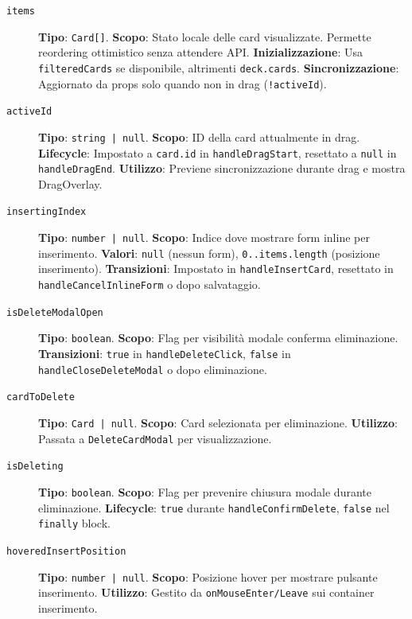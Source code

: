 \documentclass[11pt,a4paper]{article}
\begin{document}
\begin{description}
    \item[\texttt{items}] \textbf{Tipo}: \texttt{Card[]}. \textbf{Scopo}: Stato locale delle card visualizzate. Permette reordering ottimistico senza attendere API. \textbf{Inizializzazione}: Usa \texttt{filteredCards} se disponibile, altrimenti \texttt{deck.cards}. \textbf{Sincronizzazione}: Aggiornato da props solo quando non in drag (\texttt{!activeId}).
    
    \item[\texttt{activeId}] \textbf{Tipo}: \texttt{string | null}. \textbf{Scopo}: ID della card attualmente in drag. \textbf{Lifecycle}: Impostato a \texttt{card.id} in \texttt{handleDragStart}, resettato a \texttt{null} in \texttt{handleDragEnd}. \textbf{Utilizzo}: Previene sincronizzazione durante drag e mostra DragOverlay.
    
    \item[\texttt{insertingIndex}] \textbf{Tipo}: \texttt{number | null}. \textbf{Scopo}: Indice dove mostrare form inline per inserimento. \textbf{Valori}: \texttt{null} (nessun form), \texttt{0..items.length} (posizione inserimento). \textbf{Transizioni}: Impostato in \texttt{handleInsertCard}, resettato in \texttt{handleCancelInlineForm} o dopo salvataggio.
    
    \item[\texttt{isDeleteModalOpen}] \textbf{Tipo}: \texttt{boolean}. \textbf{Scopo}: Flag per visibilità modale conferma eliminazione. \textbf{Transizioni}: \texttt{true} in \texttt{handleDeleteClick}, \texttt{false} in \texttt{handleCloseDeleteModal} o dopo eliminazione.
    
    \item[\texttt{cardToDelete}] \textbf{Tipo}: \texttt{Card | null}. \textbf{Scopo}: Card selezionata per eliminazione. \textbf{Utilizzo}: Passata a \texttt{DeleteCardModal} per visualizzazione.
    
    \item[\texttt{isDeleting}] \textbf{Tipo}: \texttt{boolean}. \textbf{Scopo}: Flag per prevenire chiusura modale durante eliminazione. \textbf{Lifecycle}: \texttt{true} durante \texttt{handleConfirmDelete}, \texttt{false} nel \texttt{finally} block.
    
    \item[\texttt{hoveredInsertPosition}] \textbf{Tipo}: \texttt{number | null}. \textbf{Scopo}: Posizione hover per mostrare pulsante inserimento. \textbf{Utilizzo}: Gestito da \texttt{onMouseEnter/Leave} sui container inserimento.
\end{description}
\end{document}
